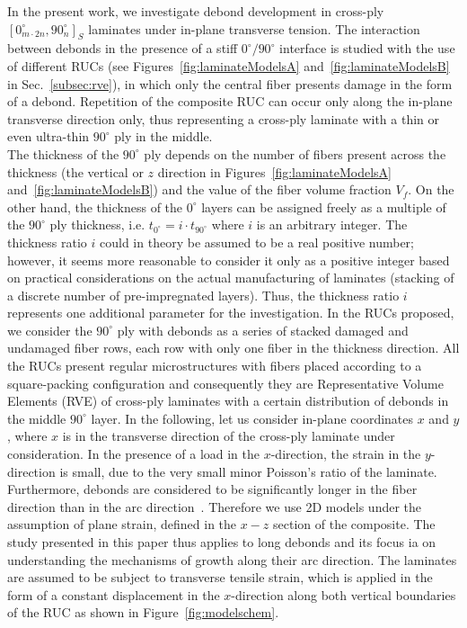\documentclass[review]{elsarticle}
\begin{document}
In the present work, we investigate debond development in cross-ply $\left[0_{m\cdot2n}^{\circ},90_{n}^{\circ}\right]_{S}$ laminates under in-plane transverse tension. The interaction between debonds in the presence of a stiff $0^{\circ}/90^{\circ}$ interface is studied with the use of different RUCs (see Figures~\ref{fig:laminateModelsA} and~\ref{fig:laminateModelsB} in Sec.~\ref{subsec:rve}), in which only the central fiber presents damage in the form of a debond. Repetition of the composite RUC can occur only along the in-plane transverse direction only, thus representing a cross-ply laminate with a thin or even ultra-thin $90^{\circ}$ ply in the middle.\\
The thickness of the $90^{\circ}$ ply depends on the number of fibers present across the thickness (the vertical or $z$ direction in Figures~\ref{fig:laminateModelsA} and~\ref{fig:laminateModelsB}) and the value of the fiber volume fraction $V_{f}$. On the other hand, the thickness of the $0^{\circ}$ layers can be assigned freely as a multiple of the $90^{\circ}$ ply thickness, i.e. $t_{0^{\circ}}=i\cdot t_{90^{\circ}}$ where $i$ is an arbitrary integer. The thickness ratio $i$ could in theory be assumed to be a real positive number; however, it seems more reasonable to consider it only as a positive integer based on practical considerations on the actual manufacturing  of laminates (stacking of a discrete number of pre-impregnated layers). Thus, the thickness ratio $i$ represents one additional parameter for the investigation. In the RUCs proposed, we consider the $90^{\circ}$ ply with debonds as a series of stacked damaged and undamaged fiber rows, each row with only one fiber in the thickness direction. All the RUCs present regular microstructures with fibers placed according to a square-packing configuration and consequently they are Representative Volume Elements (RVE) of cross-ply laminates with a certain distribution of debonds in the middle $90^{\circ}$ layer. In the following, let us consider in-plane coordinates $x$ and $y$, where $x$ is in the transverse direction of the cross-ply laminate under consideration. In the presence of a load in the $x$-direction, the strain in the $y$-direction is small, due to the very small minor Poisson's ratio of the laminate. Furthermore, debonds are considered to be significantly longer in the fiber direction than in the arc direction~\cite{Zhang1997}. Therefore we use 2D models under the assumption of plane strain, defined in the $x-z$ section of the composite. The study presented in this paper thus applies to long debonds and its focus ia on understanding the mechanisms of growth along their arc direction. The laminates are assumed to be subject to transverse tensile strain, which is applied in the form of a constant displacement in the $x$-direction along both vertical boundaries of the RUC as shown in  Figure~\ref{fig:modelschem}.\\
\end{document}
